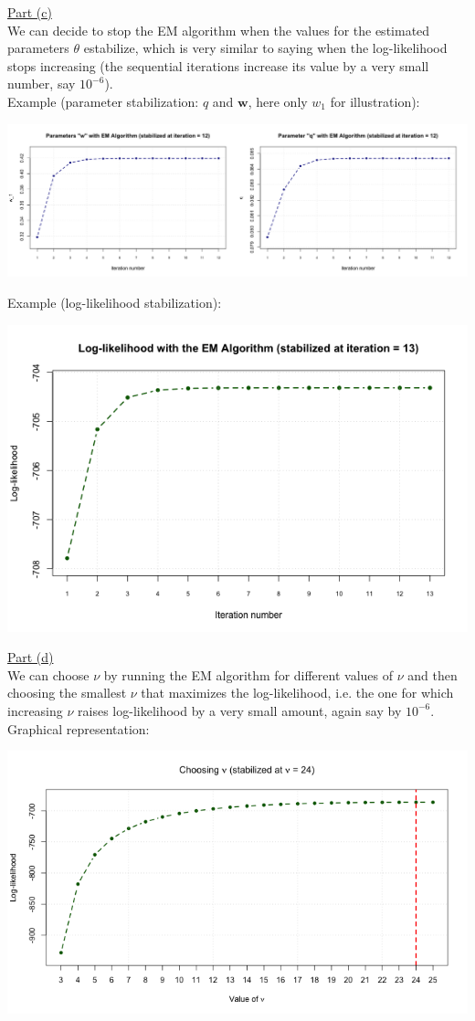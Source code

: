 \documentclass[a4paper, 11pt]{article}
\begin{document}
\underline{Part (c)}\\
\newline We can decide to stop the EM algorithm when the values for the estimated parameters $\theta$ estabilize, which is very similar to saying when the log-likelihood stops increasing (the sequential iterations increase its value by a very small number, say $10^{-6}$).\\
\newline Example (parameter stabilization: $q$ and $\mathbf{w}$, here only $w_1$ for illustration):
\begin{center}
\includegraphics[scale=0.4]{ps6_plot3.png}
\end{center}
Example (log-likelihood stabilization):
\begin{center}
\includegraphics[scale=0.6]{ps6_plot4.png}
\end{center}
\underline{Part (d)}\\
\newline We can choose $\nu$ by running the EM algorithm for different values of $\nu$ and then choosing the smallest $\nu$ that maximizes the log-likelihood, i.e. the one for which increasing $\nu$ raises log-likelihood by a very small amount, again say by $10^{-6}$.\\
\newline Graphical representation:
\begin{center}
\includegraphics[scale=0.7]{ps6_plot5.png}
\end{center}
\end{document}
